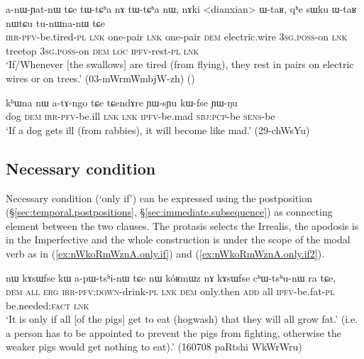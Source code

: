 \begin{exe}
\ex \label{ex:anWYatnW.tCe}
 \gll a-nɯ-ɲat-nɯ tɕe tɯ-tɕʰa nɤ tɯ-tɕʰa nɯ, nɤki <dianxian> ɯ-taʁ,  qʰe sɯku ɯ-taʁ nɯtɕu tu-nɯna-nɯ tɕe \\
 \textsc{irr}-\textsc{pfv}-be.tired-\textsc{pl} \textsc{lnk} one-pair \textsc{lnk} one-pair \textsc{dem} electric.wire \textsc{3sg}.\textsc{poss}-on \textsc{lnk} treetop \textsc{3sg}.\textsc{poss}-on \textsc{dem} \textsc{loc} \textsc{ipfv}-rest-\textsc{pl} \textsc{lnk} \\
\glt `If/Whenever  [the swallows] are tired (from flying), they rest in pairs on electric wires or on trees.' (03-mWrmWmbjW-zh)
()
\end{exe}


\begin{exe}
\ex \label{ex:atAngo.tCe}
 \gll kʰɯna nɯ a-tɤ-ngo tɕe tɕendɤre ɲɯ-sɲu kɯ-fse ɲɯ-ŋu \\
 dog \textsc{dem} \textsc{irr}-\textsc{pfv}-be.ill \textsc{lnk} \textsc{lnk} \textsc{ipfv}-be.mad \textsc{sbj}:\textsc{pcp}-be \textsc{sens}-be \\
\glt `If a dog gets ill (from rabbies), it will become like mad.' (29-chWsYu)
\end{exe}

 
 
\subsection{Necessary condition} \label{sec:only.if}
Necessary condition (`only if') can be expressed using the postposition  (§\ref{sec:temporal.postpositions}, §\ref{sec:immediate.subsequence}) as connecting element between the two clauses. The protasis selects the Irrealis, the apodosis is in the Imperfective and the whole construction is under the scope of the modal verb  as in  (\ref{ex:nWkoRmWznA.only.if}) and (\ref{ex:nWkoRmWznA.only.if2}).

\begin{exe}
	\ex \label{ex:nWkoRmWznA.only.if}
	\gll nɯ kɤsɯfse kɯ a-pɯ-tsʰi-nɯ tɕe nɯ 	kóʁmɯz nɤ kɤsɯfse cʰɯ-tsʰu-nɯ ra tɕe,  \\
	\textsc{dem} \textsc{all} \textsc{erg} \textsc{irr}-\textsc{pfv}:\textsc{down}-drink-\textsc{pl} \textsc{lnk} \textsc{dem}  only.then \textsc{add} all \textsc{ipfv}-be.fat-\textsc{pl} be.needed:\textsc{fact} \textsc{lnk} \\
	\glt `It is only if all [of the pigs] get to eat (hogwash) that they will all grow fat.' 	(i.e. a person has to be appointed to prevent the pigs from fighting, otherwise the weaker pigs would get nothing to eat).' (160708 paRtshi WkWrWru)
\end{exe}

